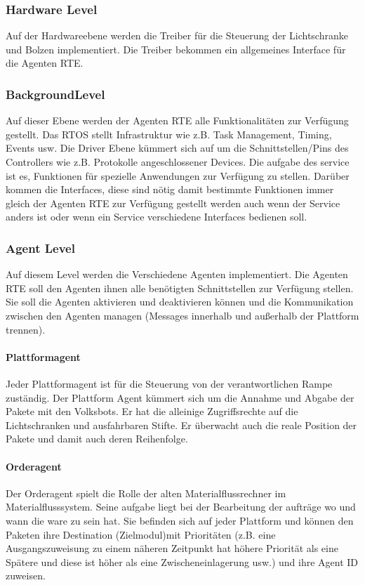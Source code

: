 \subsubsection{Hardware Level}
Auf der Hardwareebene werden die Treiber für die Steuerung der Lichtschranke und Bolzen implementiert. Die Treiber bekommen ein
allgemeines Interface für die Agenten RTE.
\subsubsection{BackgroundLevel}
Auf dieser Ebene werden der Agenten RTE alle Funktionalitäten zur Verfügung gestellt. Das RTOS stellt Infrastruktur wie z.B. Task Management, 
Timing, Events usw. Die Driver Ebene kümmert sich auf um die Schnittstellen/Pins des Controllers wie z.B. Protokolle angeschlossener
Devices\cite[S. 26]{Stasch:Hahn}. Die aufgabe des service ist es, Funktionen für spezielle Anwendungen zur Verfügung zu stellen.
Darüber kommen die Interfaces, diese sind nötig damit bestimmte Funktionen immer gleich der Agenten RTE zur Verfügung gestellt werden 
auch wenn der Service anders ist oder wenn ein Service verschiedene Interfaces bedienen soll\cite[S. 26]{Stasch:Hahn}.
\subsubsection{Agent Level}
Auf diesem Level werden die Verschiedene Agenten implementiert. Die Agenten RTE soll den Agenten ihnen alle benötigten Schnittstellen zur
Verfügung stellen. Sie soll die Agenten aktivieren und deaktivieren können und die Kommunikation zwischen den Agenten managen
(Messages innerhalb und außerhalb der Plattform trennen)\cite[S. 26]{Stasch:Hahn}. 
\paragraph{Plattformagent}
Jeder Plattformagent ist für die Steuerung von der verantwortlichen Rampe zuständig.
Der Plattform Agent kümmert sich um die Annahme und Abgabe der Pakete mit den Volksbots. Er
hat die alleinige Zugriffsrechte auf die Lichtschranken und ausfahrbaren Stifte. Er überwacht auch die reale Position 
der Pakete und damit auch deren Reihenfolge.
\paragraph{Orderagent}
Der Orderagent spielt die Rolle der alten Materialflussrechner im Materialflusssystem. Seine aufgabe liegt bei der Bearbeitung der aufträge
wo und wann die ware zu sein hat. Sie befinden sich auf jeder Plattform und können den Paketen ihre Destination (Zielmodul)mit Prioritäten (z.B.
eine Ausgangszuweisung zu einem näheren Zeitpunkt hat höhere Priorität als eine Spätere und diese ist höher als eine Zwischeneinlagerung usw.) 
und ihre Agent ID zuweisen\cite[S. 30]{Stasch:Hahn}. 
